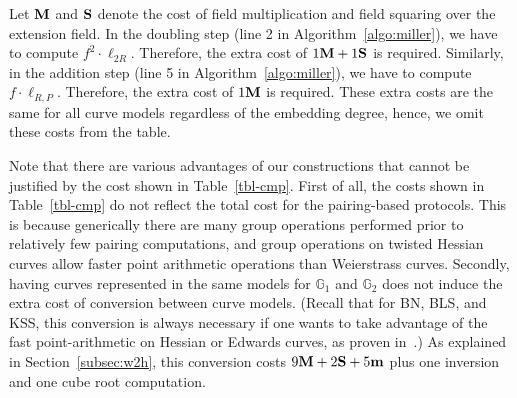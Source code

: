 Let $\textbf{M}$ and $\textbf{S}$ denote the cost of field multiplication and field squaring over the extension field.
In the doubling step (line 2 in Algorithm~\ref{algo:miller}),
we have to compute $f^2 \cdot \ell_{2R}$.
Therefore, the extra cost of $1\textbf{M} + 1\textbf{S}$ is required.
Similarly, in the addition step (line 5 in Algorithm~\ref{algo:miller}),
we have to compute $f \cdot \ell_{R,P}$.
Therefore, the extra cost of $1\textbf{M}$ is required.
These extra costs are the same for all curve models regardless of the embedding degree, hence, we omit these costs from the table.

Note that there are various advantages of our constructions that cannot be justified by the cost shown in Table~\ref{tbl-cmp}.
First of all, the costs shown in Table~\ref{tbl-cmp} do not reflect the total cost for the pairing-based protocols.
This is because generically there are many group operations performed prior to relatively few pairing computations,
and group operations on twisted Hessian curves allow faster point arithmetic operations than Weierstrass curves.
Secondly, having curves represented in the same models for $\mathbb{G}_1$ and $\mathbb{G}_2$ does not induce the extra cost of conversion between curve models.
(Recall that for BN, BLS, and KSS, this conversion is always necessary if one wants to take advantage of
the fast point-arithmetic on Hessian or Edwards curves, as proven in~\cite{2013/bos-pairing}.)
As explained in Section~\ref{subsec:w2h}, 
this conversion costs $9\textbf{M} + 2\textbf{S} + 5\textbf{m}$ plus one inversion and one cube root computation.


